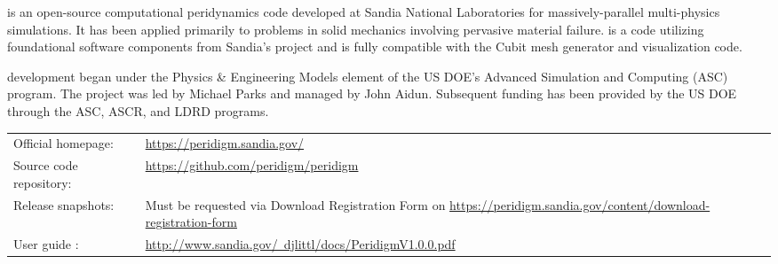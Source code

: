 % 
%               
%          
% 


\marktool[\tooladdress]{\toolnameshort} is an open-source computational peridynamics code developed at Sandia National Laboratories for massively-parallel multi-physics simulations.  It has been applied primarily to problems in solid mechanics involving pervasive material failure.  \marktool[\tooladdress]{\toolnameshort} is a \Cpp{} code utilizing foundational software components from Sandia's  project and is fully compatible with the Cubit mesh generator and \marktool[\paraviewname]{\paraviewname} visualization code.

\marktool[\tooladdress]{\toolnameshort} development began under the Physics \& Engineering Models element of the US DOE's Advanced Simulation and Computing (ASC) program.  The project was led by Michael Parks and managed by John Aidun.  Subsequent funding has been provided by the US DOE through the ASC, ASCR, and LDRD programs.


{
\renewcommand{\arraystretch}{1.3}
\begin{tabularx}{\linewidth}{@{}lX}
Official homepage:      & \href{https://peridigm.sandia.gov/}{https://peridigm.sandia.gov/}\\
Source code repository: & \href{https://github.com/peridigm/peridigm}{https://github.com/peridigm/peridigm}\\
Release snapshots:      & Must be requested via Download Registration Form on \href{https://peridigm.sandia.gov/content/download-registration-form}{https://peridigm.sandia.gov/content/download-registration-form}\\
User guide \cite{PeridigmUserGuide100}:& \href{http://www.sandia.gov/~djlittl/docs/PeridigmV1.0.0.pdf}{http://www.sandia.gov/~djlittl/docs/PeridigmV1.0.0.pdf}
\end{tabularx}
}

